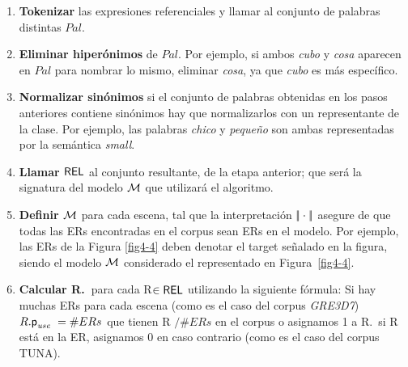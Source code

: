 \begin{enumerate}
\item \textbf{Tokenizar} las expresiones referenciales y llamar al conjunto de palabras distintas
 $Pal$. %

\item \textbf{Eliminar hiper\'onimos} de $Pal$. Por ejemplo, si ambos \emph{cubo} y
  \emph{cosa} aparecen en $Pal$ para nombrar lo mismo, eliminar \emph{cosa}, ya que \emph{cubo} es m\'as espec\'ifico.

\item \textbf{Normalizar sin\'onimos} si el conjunto de palabras obtenidas en los pasos anteriores contiene
  sin\'onimos hay que normalizarlos con un representante de la clase. Por ejemplo, las palabras \emph{chico}
  y \emph{peque\~no} son ambas representadas por la sem\'antica \emph{small}.

\item \textbf{Llamar $\textsf{REL}$} al conjunto resultante, de la etapa anterior; que ser\'a la signatura del modelo $\mathcal{M}$ que utilizar\'a el algoritmo.

\item \textbf{Definir $\mathcal{M}$} para cada escena, tal que la interpretaci\'on
 $|\!|\cdot|\!|$ asegure de que todas las ERs encontradas en el corpus sean ERs en
  el modelo. Por ejemplo, las ERs de la Figura \ref{fig4-4} deben denotar el target se\~nalado en la figura, siendo el modelo 
$\mathcal{M}$ considerado el representado en Figura~\ref{fig4-4}.
\item \textbf{Calcular R.\puse\ }para cada R$\in \textsf{REL}$ utilizando la siguiente f\'ormula: Si
  hay muchas ERs para cada escena (como es el caso del corpus \textit{GRE3D7}) $R.\textsf{p}_\textit{use}\ = \#ERs$ que tienen R $/\#ERs$ en el corpus o asignamos 1 a R.\puse \ si R est\'a en la ER, asignamos 0 en caso contrario (como es el caso del corpus TUNA).
\end{enumerate}


